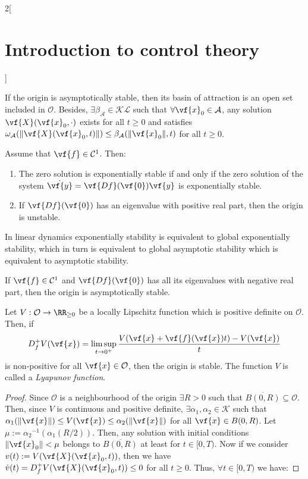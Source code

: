 \documentclass[../../../main_math.tex]{subfiles}
\begin{document}
\begin{multicols}{2}[\section{Introduction to control theory}]
\begin{definition}
  \end{definition}
  \begin{theorem}
    If the origin is asymptotically stable, then its basin of attraction is an open set included in $\mathcal{O}$. Besides, $\exists \beta_\mathcal{A}\in \mathcal{KL}$ such that $\forall \vf{x}_0\in\mathcal{A}$, any solution $\vf{X}(\vf{x}_0, \cdot)$ exists for all $t\geq 0$ and satisfies $\omega_{\mathcal{A}}(\norm{\vf{X}(\vf{x}_0, t)})\leq \beta_\mathcal{A}(\norm{\vf{x}_0}, t)$ for all $t\geq 0$.
  \end{theorem}
  \begin{theorem}
    Assume that $\vf{f}\in\mathcal{C}^1$. Then:
    \begin{enumerate}
      \item The zero solution is exponentially stable if and only if the zero solution of the system $\dot{\vf{y}}=\vf{Df}(\vf{0}) \vf{y}$ is exponentially stable.
      \item If $\vf{Df}(\vf{0})$ has an eigenvalue with positive real part, then the origin is unstable.
    \end{enumerate}
  \end{theorem}
  \begin{remark}
    In linear dynamics exponentially stability is equivalent to global exponentially stability, which in turn is equivalent to global asymptotic stability which is equivalent to asymptotic stability.
  \end{remark}
  \begin{corollary}
    If $\vf{f}\in\mathcal{C}^1$ and $\vf{Df}(\vf{0})$ has all its eigenvalues with negative real part, then the origin is asymptotically stable.
  \end{corollary}
  \begin{theorem}
    Let $V:\mathcal{O}\to \RR_{\geq 0}$ be a locally Lipschitz function which is positive definite on $\mathcal{O}$. Then, if
    $$
      D_f^+V(\vf{x}) = \limsup_{t\to 0^+}\frac{V(\vf{x} + \vf{f}(\vf{x})t) - V(\vf{x})}{t}
    $$
    is non-positive for all $\vf{x}\in \mathcal{O}$, then the origin is stable. The function $V$ is called a \emph{Lyapunov function}.
  \end{theorem}
  \begin{proof}
    Since $\mathcal{O}$ is a neighbourhood of the origin $\exists R>0$ such that $\overline{B(0,R)}\subseteq \mathcal{O}$. Then, since $V$ is continuous and positive definite, $\exists \alpha_1,\alpha_2\in\mathcal{K}$ such that $\alpha_1(\norm{\vf{x}})\leq V(\vf{x})\leq \alpha_2(\norm{\vf{x}})$ for all $\vf{x}\in B(0,R)$. Let $\mu:={\alpha_2}^{-1}(\alpha_1(R/2))$. Then, any solution with initial conditions $\norm{\vf{x}_0}<\mu$ belongs to $\overline{B(0,R)}$ at least for $t\in[0, T)$. Now if we consider $v(t) := V(\vf{X}(\vf{x}_0, t))$, then we have $\dot{v}(t) = D_f^+V(\vf{X}(\vf{x}_0, t))\leq 0$ for all $t\geq 0$. Thus, $\forall t \in [0, T)$ we have:

\end{proof}
\end{multicols}
\end{document}
